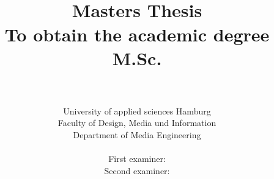 
\title{\titel\\[2ex]
\LARGE Masters Thesis\\
\large To obtain the academic degree M.Sc.\\[1.5ex]
\LARGE \vorname~\nachname\\[0.5ex] 
\large \matrikelnummer
}

\author{
\large{}\hspace{1ex}
\parbox[b]{11.2cm}{\sffamily\large%
University of applied sciences Hamburg\\[-0.2ex]
Faculty of Design, Media und Information\\[-0.2ex]
Department of Media Engineering
}\\[6ex]
\sffamily\large First examiner: \erstpruef\\[0.5ex]
\sffamily\large Second examiner: \zweitpruef}

